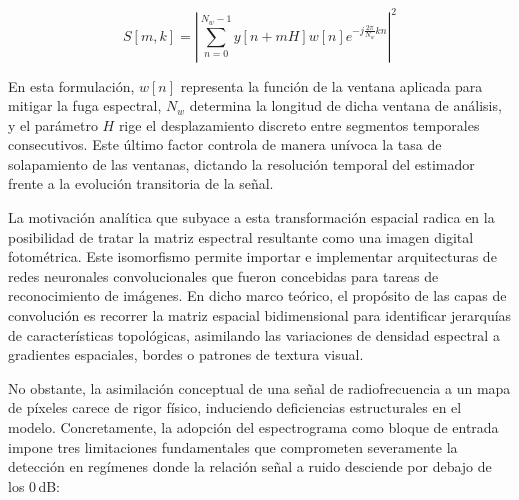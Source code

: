 \begin{equation}
    S[m,k] = \left| \sum_{n=0}^{N_w-1} y[n+mH] w[n] e^{-j\frac{2\pi}{N_w}kn} \right|^2
    \label{eq:espectrograma}
\end{equation}

En esta formulación, $w[n]$ representa la función de la ventana aplicada para mitigar la fuga espectral, $N_w$ determina la longitud de dicha ventana de análisis, y el parámetro $H$ rige el desplazamiento discreto entre segmentos temporales consecutivos. Este último factor controla de manera unívoca la tasa de solapamiento de las ventanas, dictando la resolución temporal del estimador frente a la evolución transitoria de la señal.

La motivación analítica que subyace a esta transformación espacial radica en la posibilidad de tratar la matriz espectral resultante como una imagen digital fotométrica. Este isomorfismo permite importar e implementar arquitecturas de redes neuronales convolucionales que fueron concebidas para tareas de reconocimiento de imágenes. En dicho marco teórico, el propósito de las capas de convolución es recorrer la matriz espacial bidimensional para identificar jerarquías de características topológicas, asimilando las variaciones de densidad espectral a gradientes espaciales, bordes o patrones de textura visual. 

No obstante, la asimilación conceptual de una señal de radiofrecuencia a un mapa de píxeles carece de rigor físico, induciendo deficiencias estructurales en el modelo. Concretamente, la adopción del espectrograma como bloque de entrada impone tres limitaciones fundamentales que comprometen severamente la detección en regímenes donde la relación señal a ruido desciende por debajo de los 0\,dB:

